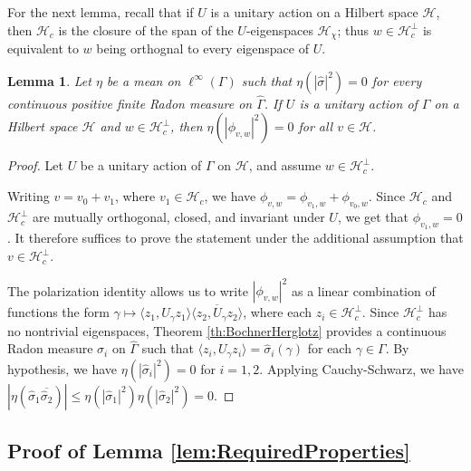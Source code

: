 \documentclass[12pt]{amsart} \usepackage{amsmath,centernot,amssymb,leftindex}
\newtheorem{lemma}[theorem]{Lemma}
\numberwithin{theorem}{section}
\numberwithin{equation}{section}
\theoremstyle{definition}
\begin{document}
For the next lemma, recall that if $U$ is a unitary action on a Hilbert space $\mathcal H$, then $\mathcal H_{c}$ is the closure of the span of the $U$-eigenspaces $\mathcal H_{\chi}$; thus $w\in \mathcal H_{c}^{\perp}$ is equivalent to $w$ being orthognal to every eigenspace of $U$. 

\begin{lemma}\label{lem:AnnihilatesImpliesFS}
	Let $\eta$ be a mean on $\ell^{\infty}(\Gamma)$ such that $\eta(|\hat{\sigma}|^{2})=0$ for every continuous positive finite Radon measure on $\widehat{\Gamma}$.  If $U$ is a unitary action of $\Gamma$ on a Hilbert space $\mathcal H$ and $w\in \mathcal H_{c}^{\perp}$, then $\eta(|\phi_{v,w}|^{2})=0$ for all $v\in \mathcal H$.	
\end{lemma}

\begin{proof}
	Let $U$ be a unitary action of $\Gamma$ on $\mathcal H$, and assume $w\in \mathcal H_{c}^{\perp}$.  
	
	Writing $v=v_{0}+v_{1}$, where $v_{1}\in \mathcal H_{c}$, we have $\phi_{v,w}=\phi_{v_{1},w}+\phi_{v_{0},w}$.  
	Since $\mathcal H_{c}$ and $\mathcal H_{c}^{\perp}$ are mutually orthogonal, closed, and invariant under $U$, we get that $\phi_{v_{1},w}=0$. It therefore suffices to prove the statement under the additional assumption that $v\in \mathcal H_{c}^{\perp}$.
	
	The polarization identity allows us to write $|\phi_{v,w}|^{2}$ as a linear combination of functions the form $\gamma \mapsto \langle z_{1}, U_\gamma z_{1}\rangle\overline{\langle z_{2}, U_\gamma z_{2}\rangle}$, where each $z_{i}\in \mathcal H_{c}^{\perp}$.  Since $\mathcal H_{c}^{\perp}$ has no nontrivial eigenspaces, Theorem \ref{th:BochnerHerglotz} provides a continuous Radon measure $\sigma_{i}$ on $\widehat{\Gamma}$  such that $\langle z_{i}, U_{\gamma} z_{i}\rangle=\hat{\sigma}_{i}(\gamma)$ for each $\gamma\in \Gamma$.  By hypothesis, we have $\eta(|\hat{\sigma}_{i}|^{2})=0$ for $i=1,2$. Applying Cauchy-Schwarz, we have $|\eta(\hat{\sigma}_{1}\overline{\hat{\sigma}_{2}})|\leq \eta(|\hat{\sigma}_{1}|^{2})\eta(|\hat{\sigma}_{2}|^{2})=0$.
\end{proof}

\subsection{Proof of Lemma \ref{lem:RequiredProperties}}
\end{document}
